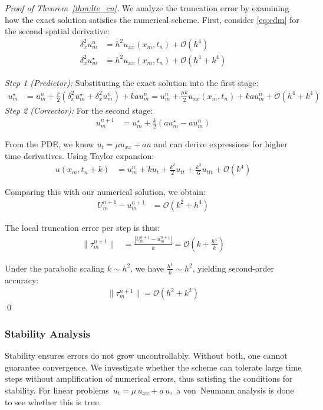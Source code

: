 \begin{proof}[Proof of Theorem~\ref{thm:lte_cn}]
  We analyze the truncation error by examining how the exact solution satisfies the numerical scheme.
  \medskip
  First, consider \eqref{eq:cdm} for the second spatial derivative:
  \begin{align*}
    \delta_x^2 u_m^n     & = h^2u_{xx}(x_m,t_n) + \mathcal{O}(h^4)       \\
    \delta_x^2 u_m^\star & = h^2u_{xx}(x_m,t_n) + \mathcal{O}(h^4 + k^4)
  \end{align*}

  \textit{Step 1 (Predictor):} Substituting the exact solution into the first stage:
  \begin{align*}
    u_m^\star & = u_m^n + \frac{r}{2}\left(\delta_x^2 u_m^\star + \delta_x^2 u_m^n\right) + kau_m^n = u_m^n + \frac{\mu k}{2}u_{xx}(x_m,t_n) + kau_m^n + \mathcal{O}(h^4 + k^4)
  \end{align*}
  \textit{Step 2 (Corrector):} For the second stage:
  \begin{align*}
    u_m^{n+1} & = u_m^\star + \frac{k}{2}(au_m^\star - au_m^n)
  \end{align*}

  From the PDE, we know $u_t = \mu u_{xx} + au$ and can derive expressions for higher time derivatives. Using Taylor expansion:
  \begin{align*}
    u(x_m,t_n+k) & = u_m^n + ku_t + \frac{k^2}{2}u_{tt} + \frac{k^3}{6}u_{ttt} + \mathcal{O}(k^4)
  \end{align*}

  Comparing this with our numerical solution, we obtain:
  \begin{align*}
    U_m^{n+1} - u_m^{n+1} & = \mathcal{O}(k^2 + h^4)
  \end{align*}

  The local truncation error per step is thus:
  \begin{align*}
    \|\tau_m^{n+1}\| & = \frac{|U_m^{n+1} - u_m^{n+1}|}{k} = \mathcal{O}\left(k + \frac{h^4}{k}\right)
  \end{align*}

  Under the parabolic scaling $k \sim h^2$, we have $\frac{h^4}{k} \sim h^2$, yielding second-order accuracy:
  \begin{align*}
    \|\tau_m^{n+1}\| = \mathcal{O}(h^2 + k^2)
  \end{align*}\qed
\end{proof}

\subsubsection{Stability Analysis}
Stability ensures errors do not grow uncontrollably. Without both, one cannot guarantee convergence.
We investigate whether the scheme can tolerate large time steps without amplification of numerical errors, thus
satisfing the conditions for stability.
For linear problems
\(\,u_t = \mu\,u_{xx} + a\,u,\) a von~Neumann analysis is done to see whether
this is true.

